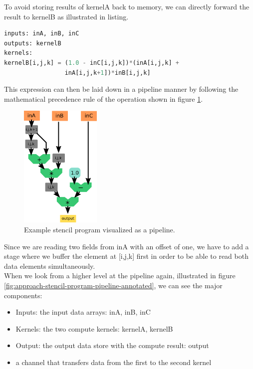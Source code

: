 To avoid storing results of kernelA back to memory, we can directly forward the result to kernelB as illustrated in listing.
\begin{lstlisting}[showstringspaces=false, frame=single, language=Python, label={lst:example-stencil-program-substituted}]     
inputs: inA, inB, inC
outputs: kernelB
kernels:
kernelB[i,j,k] = (1.0 - inC[i,j,k])*(inA[i,j,k] +
                 inA[i,j,k+1])*inB[i,j,k]
\end{lstlisting}
This expression can then be laid down in a pipeline manner by following the mathematical precedence rule of the operation shown in figure \ref{fig:approach-stencil-program-pipeline}.
\begin{figure}[h]
	\centering
	\includegraphics[height=16em]{drawings/approach-stencil-program-pipeline.png}
	\caption{Example stencil program visualized as a pipeline.}
	\label{fig:approach-stencil-program-pipeline}
\end{figure}
Since we are reading two fields from inA with an offset of one, we have to add a stage where we buffer the element at [i,j,k] first in order to be able to read both data elements simultaneously. \\
When we look from a higher level at the pipeline again, illustrated in figure \ref{fig:approach-stencil-program-pipeline-annotated}, we can see the major components:
\begin{itemize}
	\item Inputs: the input data arrays: inA, inB, inC
	\item Kernels: the two compute kernels: kernelA, kernelB
	\item Output: the output data store with the compute result: output
	\item a channel that transfers data from the first to the second kernel
\end{itemize}

